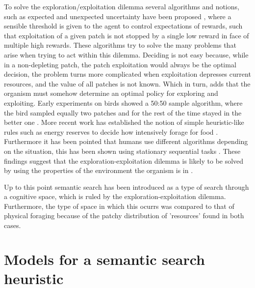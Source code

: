 \documentclass[11pt]{article}
\begin{document}
To solve the exploration/exploitation dilemma several algorithms and notions,
such as expected and unexpected uncertainty have been proposed
\citep{mehlhornUnpackingExplorationExploitation2015a}, where a sensible threshold
is given to the agent to control expectations of rewards, such that exploitation
of a given patch is not stopped by a single low reward in face of multiple high
rewards. These algorithms try to solve the many problems that arise when trying
to act within this dilemma. Deciding is not easy because, while in a
non-depleting patch, the patch exploitation would always be the optimal
decision, the problem turns more complicated when exploitation depresses current
resources, and the value of all patches is not known. Which in turn, adds that
the organism must somehow determine an optimal policy for exploring and
exploiting. Early experiments on birds showed a 50:50 sample algorithm, where
the bird sampled equally two patches and for the rest of the time stayed in the
better one \citep{krebsTestOptimalSampling1978}. More recent work has established
the notion of simple heuristic-like rules such as energy reserves to decide how
intensively forage for food \citep{higginsonTrustYourGut2018}. Furthermore it has
been pointed that humans use different algorithms depending on the situation,
this has been shown using stationary sequential tasks
\citep{gershmanDeconstructingHumanAlgorithms2018}. These findings suggest that the
exploration-exploitation dilemma is likely to be solved by using the properties
of the environment the organism is in
\citep{fawcettEvolutionDecisionRules2014,hernandez-lealExplorationStrategyNonstationary2016}.

Up to this point semantic search has been introduced as a type of search through
a cognitive space, which is ruled by the exploration-exploitation dilemma.
Furthermore, the type of space in which this ocurrs was compared to that of
physical foraging \citep{hillsOptimalForagingSemantic2009} because of the patchy
distribution of 'resources' found in both cases.

\newpage
\section{Models for a semantic search heuristic}
\label{sec:org9dc2b1a}
\end{document}
